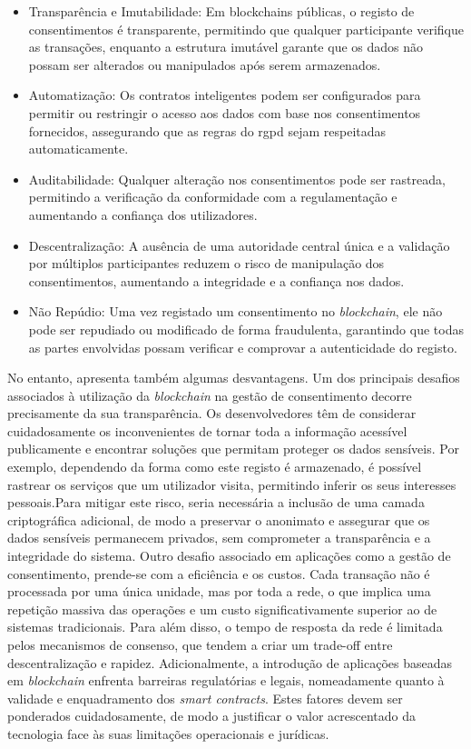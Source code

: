 \begin{itemize}
    \item Transparência e Imutabilidade: Em blockchains públicas, o registo de consentimentos é transparente, permitindo que qualquer participante verifique as transações, enquanto a estrutura imutável garante que os dados não possam ser alterados ou manipulados após serem armazenados.
    \item Automatização: Os contratos inteligentes podem ser configurados para permitir ou restringir o acesso aos dados com base nos consentimentos fornecidos, assegurando que as regras do \acrshort{rgpd} sejam respeitadas automaticamente.
    \item Auditabilidade: Qualquer alteração nos consentimentos pode ser rastreada, permitindo a verificação da conformidade com a regulamentação e aumentando a confiança dos utilizadores.
    \item Descentralização: A ausência de uma autoridade central única e a validação por múltiplos participantes reduzem o risco de manipulação dos consentimentos, aumentando a integridade e a confiança nos dados.
    \item Não Repúdio: Uma vez registado um consentimento no \textit{blockchain}, ele não pode ser repudiado ou modificado de forma fraudulenta, garantindo que todas as partes envolvidas possam verificar e comprovar a autenticidade do registo.
\end{itemize}

No entanto, apresenta também algumas desvantagens. Um dos principais desafios associados à utilização da \textit{blockchain} na gestão de consentimento decorre precisamente da sua transparência. Os desenvolvedores têm de considerar cuidadosamente os inconvenientes de tornar toda a informação acessível publicamente e encontrar soluções que permitam proteger os dados sensíveis. Por exemplo, dependendo da forma como este registo é armazenado, é possível rastrear os serviços que um utilizador visita, permitindo inferir os seus interesses pessoais.Para mitigar este risco, seria necessária a inclusão de uma camada criptográfica adicional, de modo a preservar o anonimato e assegurar que os dados sensíveis permanecem privados, sem comprometer a transparência e a integridade do sistema.
Outro desafio associado em aplicações como a gestão de consentimento, prende-se com a eficiência e os custos. Cada transação não é processada por uma única unidade, mas por toda a rede, o que implica uma repetição massiva das operações e um custo significativamente superior ao de sistemas tradicionais. Para além disso, o tempo de resposta da rede é limitada pelos mecanismos de consenso, que tendem a criar um trade-off entre descentralização e rapidez. Adicionalmente, a introdução de aplicações baseadas em \textit{blockchain} enfrenta barreiras regulatórias e legais, nomeadamente quanto à validade e enquadramento dos \textit{smart contracts}. Estes fatores devem ser ponderados cuidadosamente, de modo a justificar o valor acrescentado da tecnologia face às suas limitações operacionais e jurídicas.

